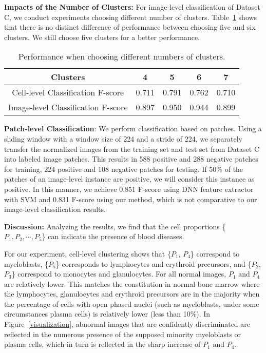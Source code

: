 \documentclass[journal]{IEEEtran}
\begin{document}
{{\textbf{Impacts of the Number of Clusters:} For image-level classification of Dataset C, we conduct experiments choosing different number of clusters. Table~\ref{image-level-cluster} shows that there is no distinct difference of performance between choosing five and six clusters. We still choose five clusters for a better performance.}}

\begin{table}[H]
\centering
\caption{\textnormal{{Performance when choosing different numbers of clusters.}} }
\label{image-level-cluster}
\begin{tabular}{|c|c|c|c|c|}
\hline{\tiny{Clusters}}& {4}     & {5}     & {6}     & {7}     \\ \hline{\tiny{Cell-level Classification F-score}}  & {0.711} & {0.791} & {0.762} & {0.710} \\ \hline{\tiny{Image-level Classification F-score}} & {0.897} & {0.950} & {0.944} & {0.899} \\ \hline
 
\end{tabular}
\end{table}

{\textbf{Patch-level Classification}: We perform classification based on patches. Using a sliding window with a window size of 224 and a stride of 224, we separately transfer the normalized images from the training set and test set from Dataset C into labeled image patches. This results in 588 positive and 288 negative patches for training, 224 positive and 108 negative patches for testing. If 50\% of the patches of an image-level instance are positive, we will consider this instance as positive. In this manner, we achieve 0.851 F-score using DNN feature extractor with SVM and 0.831 F-score using our method, which is not comparative to our image-level classification results.}

\textbf{Discussion:}
Analyzing the results, we find that the cell proportions \{$P_1, P_2, \cdots, P_5$\} can indicate the presence of blood diseases.

For our experiment, cell-level clustering shows that \{$P_1$, $P_4$\} correspond to myeloblasts, \{$P_5$\} corresponds to lymphocytes and erythroid precursors, and \{$P_2$, $P_3$\} correspond to monocytes and glanulocytes. For all normal images, $P_1$ and $P_4$ are relatively lower. This matches the constitution in normal bone marrow where the lymphocytes, glanulocytes and erythroid precursors are in the majority when the percentage of cells with open phased nuclei (such as myeloblasts, under some circumstances plasma cells) is relatively lower (less than 10\%). In Figure~\ref{visualization}, abnormal images that are confidently discriminated are reflected in the numerous presence of the supposed minority myeloblasts or plasma cells, which in turn is reflected in the sharp increase of $P_1$ and $P_4$. 
\end{document}
